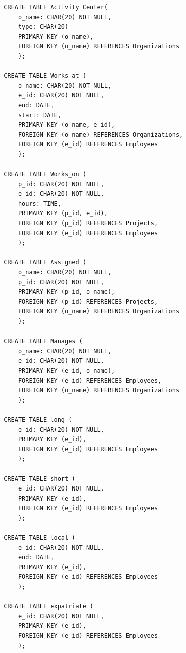 \begin{enumerate}[label={(\alph*)}]
\begin{verbatim}
        CREATE TABLE Activity Center(
            o_name: CHAR(20) NOT NULL,
            type: CHAR(20)
            PRIMARY KEY (o_name),
            FOREIGN KEY (o_name) REFERENCES Organizations 
            );
        
        CREATE TABLE Works_at (
            o_name: CHAR(20) NOT NULL,
            e_id: CHAR(20) NOT NULL,
            end: DATE,
            start: DATE,
            PRIMARY KEY (o_name, e_id),
            FOREIGN KEY (o_name) REFERENCES Organizations,
            FOREIGN KEY (e_id) REFERENCES Employees
            );
        
        CREATE TABLE Works_on (
            p_id: CHAR(20) NOT NULL,
            e_id: CHAR(20) NOT NULL,
            hours: TIME,
            PRIMARY KEY (p_id, e_id),
            FOREIGN KEY (p_id) REFERENCES Projects,
            FOREIGN KEY (e_id) REFERENCES Employees
            );
            
        CREATE TABLE Assigned (
            o_name: CHAR(20) NOT NULL,
            p_id: CHAR(20) NOT NULL,
            PRIMARY KEY (p_id, o_name),
            FOREIGN KEY (p_id) REFERENCES Projects,
            FOREIGN KEY (o_name) REFERENCES Organizations
            );
            
        CREATE TABLE Manages (
            o_name: CHAR(20) NOT NULL,
            e_id: CHAR(20) NOT NULL,
            PRIMARY KEY (e_id, o_name),
            FOREIGN KEY (e_id) REFERENCES Employees,
            FOREIGN KEY (o_name) REFERENCES Organizations
            );
        
        CREATE TABLE long (
            e_id: CHAR(20) NOT NULL,
            PRIMARY KEY (e_id),
            FOREIGN KEY (e_id) REFERENCES Employees
            );
            
        CREATE TABLE short (
            e_id: CHAR(20) NOT NULL,
            PRIMARY KEY (e_id),
            FOREIGN KEY (e_id) REFERENCES Employees
            );
            
        CREATE TABLE local (
            e_id: CHAR(20) NOT NULL,
            end: DATE,
            PRIMARY KEY (e_id),
            FOREIGN KEY (e_id) REFERENCES Employees
            );
            
        CREATE TABLE expatriate (
            e_id: CHAR(20) NOT NULL,
            PRIMARY KEY (e_id),
            FOREIGN KEY (e_id) REFERENCES Employees
            );
    \end{verbatim}
    
    
\end{enumerate}